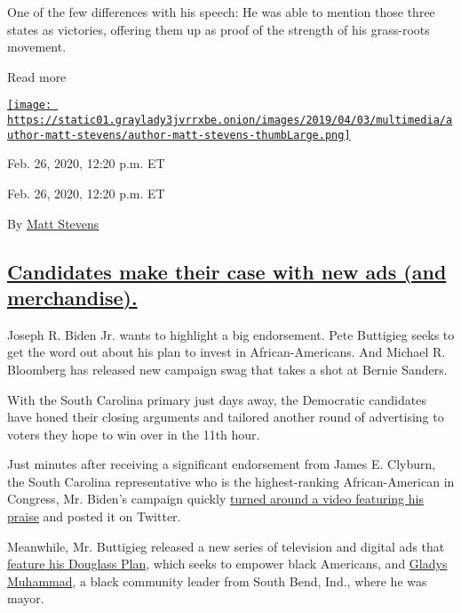 One of the few differences with his speech: He was able to mention those
three states as victories, offering them up as proof of the strength of
his grass-roots movement.

Read more

\href{https://www.nytimes3xbfgragh.onion/by/matt-stevens}{\texttt{[image: https://static01.graylady3jvrrxbe.onion/images/2019/04/03/multimedia/author-matt-stevens/author-matt-stevens-thumbLarge.png]}}

Feb. 26, 2020, 12:20 p.m. ET

Feb. 26, 2020, 12:20 p.m. ET

By \href{https://www.nytimes3xbfgragh.onion/by/matt-stevens}{Matt
Stevens}

\hypertarget{candidates-make-their-case-with-new-ads-and-merchandise}{%
\subsection{\texorpdfstring{\protect\hyperlink{candidates-make-their-case-with-new-ads-and-merchandise}{Candidates
make their case with new ads (and
merchandise).}}{Candidates make their case with new ads (and merchandise).}}\label{candidates-make-their-case-with-new-ads-and-merchandise}}

Joseph R. Biden Jr. wants to highlight a big endorsement. Pete Buttigieg
seeks to get the word out about his plan to invest in African-Americans.
And Michael R. Bloomberg has released new campaign swag that takes a
shot at Bernie Sanders.

With the South Carolina primary just days away, the Democratic
candidates have honed their closing arguments and tailored another round
of advertising to voters they hope to win over in the 11th hour.

Just minutes after receiving a significant endorsement from James E.
Clyburn, the South Carolina representative who is the highest-ranking
African-American in Congress, Mr. Biden's campaign quickly
\href{https://twitter.com/JoeBiden/status/1232683784954359808}{turned
around a video featuring his praise} and posted it on Twitter.

Meanwhile, Mr. Buttigieg released a new series of television and digital
ads that \href{https://www.youtube.com/watch?v=SUbMJprZ548}{feature his
Douglass Plan}, which seeks to empower black Americans, and
\href{https://www.youtube.com/watch?v=SUbMJprZ548}{Gladys Muhammad}, a
black community leader from South Bend, Ind., where he was mayor.

